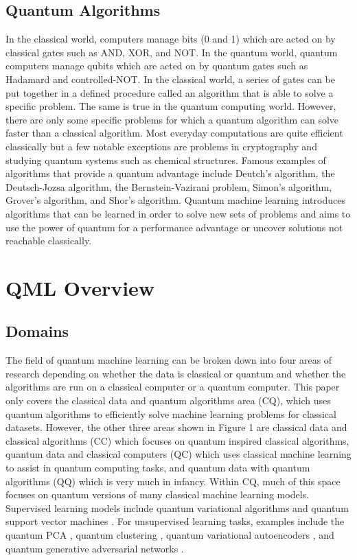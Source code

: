 \documentclass[
	a4paper, %
	10pt, %
	unnumberedsections, %
	twoside, %
]{LTJournalArticle}
\begin{document}
\subsection{Quantum Algorithms}
In the classical world, computers manage bits (0 and 1) which are acted on by classical gates such as AND, XOR, and NOT. In the quantum world, quantum computers manage qubits which are 
acted on by quantum gates such as Hadamard and controlled-NOT. In the classical world, a series of gates can be put together in a defined procedure called an algorithm that is able to 
solve a specific problem. The same is true in the quantum computing world. However, there are only some specific problems for which a quantum algorithm can solve faster than a classical 
algorithm. Most everyday computations are quite efficient classically but a few notable exceptions are problems in cryptography and studying quantum systems such as chemical structures. 
Famous examples of algorithms that provide a quantum advantage include Deutch's algorithm, the Deutsch-Jozsa algorithm, the Bernstein-Vazirani problem, Simon's algorithm, Grover's 
algorithm, and Shor's algorithm. Quantum machine learning introduces algorithms that can be learned in order to solve new sets of problems and aims to use the power of quantum for a 
performance advantage or uncover solutions not reachable classically.

\section{QML Overview}
\subsection{Domains}
The field of quantum machine learning can be broken down into four areas of research depending on whether the data is classical or quantum and whether the algorithms are run on a classical 
computer or a quantum computer. This paper only covers the classical data and quantum algorithms area (CQ), which uses quantum algorithms to efficiently solve machine learning problems for 
classical datasets. However, the other three areas shown in Figure 1 are classical data and classical algorithms (CC) which focuses on quantum inspired classical algorithms, 
quantum data and classical computers (QC) which uses classical machine learning to assist in quantum computing tasks, and quantum data with quantum algorithms (QQ) which is very much in infancy.
Within CQ, much of this space focuses on quantum versions of many classical machine learning models. Supervised learning models include quantum variational algorithms \autocite{peruzzo2013variational} 
and quantum support vector machines \autocite{havlivcek2019supervised}. For unsupervised learning tasks, examples include the quantum PCA \autocite{lloyd2014quantum}, quantum clustering \autocite{aimeur2007quantum},
quantum variational autoencoders \autocite{khoshaman2018quantum}, and quantum generative adversarial networks \autocite{dallaire2018quantum}.
\end{document}
